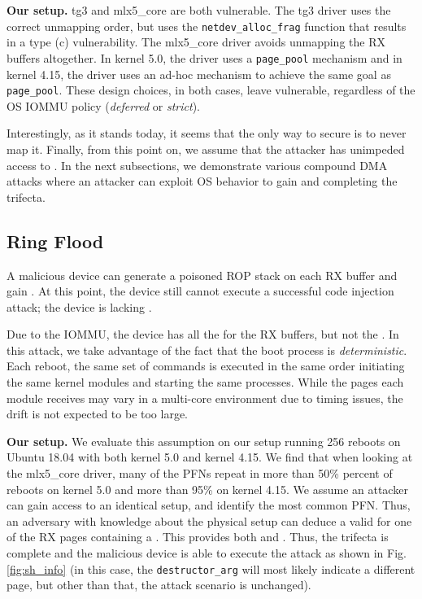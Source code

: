 \smallskip
\noindent\textbf{Our setup.} tg3 and mlx5\_core are both vulnerable. The tg3 driver uses the correct unmapping order, but uses the \texttt{netdev\_alloc\_frag} function that results in a type (c) \subpage{} vulnerability. The mlx5\_core driver avoids unmapping the RX buffers altogether. In kernel 5.0, the driver uses a \texttt{page\_pool} mechanism\cite{page_pool} and in kernel 4.15, the driver uses an ad-hoc mechanism to achieve the same goal as \texttt{page\_pool}. These design choices, in both cases, leave \shinfo{} vulnerable, regardless of the OS IOMMU policy (\emph{deferred} or \emph{strict}). 


Interestingly, as it stands today, it seems that the only way to secure \shinfo{} is to never map it. Finally, from this point on, we assume that the attacker has unimpeded access to \oportunity{}. In the next subsections, we demonstrate various compound DMA attacks where an attacker can exploit OS behavior  to gain \means{} and \motivation{} completing the trifecta.

\subsection{Ring Flood}\label{sec:ringflod}

A malicious device can generate a poisoned ROP stack on each RX buffer and gain \motivation{}. At this point, the device still cannot execute a successful code injection attack; the device is lacking \means{}. 

Due to the IOMMU, the device has all the \iova{} for the RX buffers, but not the \kva{}. In this attack, we take advantage of the fact that the boot process is \emph{deterministic}. Each reboot, the same set of commands is executed in the same order initiating the same kernel modules and starting the same processes. While the pages each module receives may vary in a multi-core environment due to timing issues, the drift is not expected to be too large. 

\smallskip
\noindent\textbf{Our setup.} We evaluate this assumption on our setup running 256 reboots on Ubuntu 18.04 with both kernel 5.0 and kernel 4.15.
We find that when looking at the mlx5\_core driver, many of the PFNs repeat in more than 50\% percent of reboots on kernel 5.0 and more than 95\% on kernel 4.15. We assume an attacker can gain access to an identical setup, and identify the most common PFN. Thus, an adversary with knowledge about the physical setup can deduce a valid \kva{} for one of the RX pages containing a \mabaf. This provides both \means{} and \motivation{}. Thus, the trifecta is complete and the malicious device is able to execute the attack as shown in Fig. \ref{fig:sh_info} (in this case, the \texttt{destructor\_arg} will most likely indicate a different page, but other than that, the attack scenario is unchanged).


